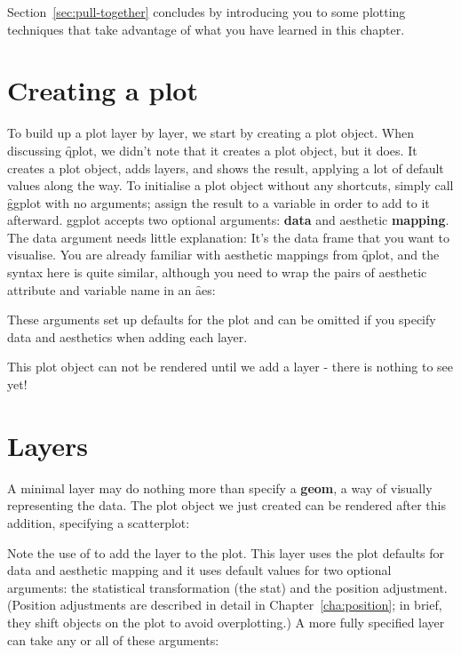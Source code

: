 Section~\ref{sec:pull-together} concludes by introducing you to some plotting techniques that take advantage of what you have learned in this chapter.


\section{Creating a plot}
\label{sec:ggplot}

To build up a plot layer by layer, we start by creating a plot object. When discussing \f{qplot}, we didn't note that it creates a plot object, but it does. It creates a plot object, adds layers, and shows the result, applying a lot of default values along the way. To initialise a plot object without any shortcuts, simply call \f{ggplot} with no arguments; assign the result to a variable in order to add to it afterward.  ggplot accepts two optional arguments: {\bf data} and aesthetic {\bf mapping}.  The data argument needs little explanation: It's the data frame that you want to visualise.  You are already familiar with aesthetic mappings from \f{qplot}, and the syntax here is quite similar, although you need to wrap the pairs of aesthetic attribute and variable name in an \f{aes}:

% 


These arguments set up defaults for the plot and can be omitted if you specify data and aesthetics when adding each layer. 

This plot object can not be rendered until we add a layer - there is nothing to see yet!

\section{Layers}
\label{sec:layers}

A minimal layer may do nothing more than specify a {\bf geom}, a way of visually representing the data.  The plot object we just created can be rendered after this addition, specifying a scatterplot:

% 


\noindent Note the use of \code{+} to add the layer to the plot.  This layer uses the plot defaults for data and aesthetic mapping and it uses default values for two optional arguments: the statistical transformation (the stat) and the position adjustment.  (Position adjustments are described in detail in Chapter~\ref{cha:position}; in brief, they shift objects on the plot to avoid overplotting.)  A more fully specified layer can take any or all of these arguments:

